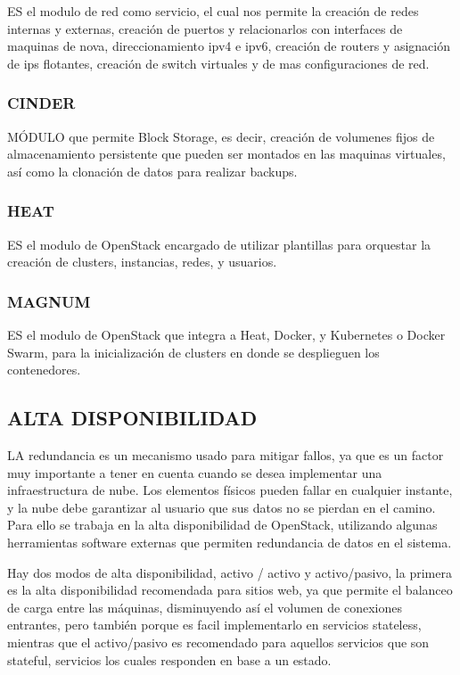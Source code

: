     ES el modulo de red como servicio, el cual nos permite la creación de redes internas y externas, creación de puertos y relacionarlos con interfaces de maquinas de nova, direccionamiento ipv4 e ipv6, creación de routers y asignación de ips flotantes, creación de switch virtuales y de mas configuraciones de red.
    
    \subsubsection{CINDER}
    
    MÓDULO que permite Block Storage, es decir, creación de volumenes fijos de almacenamiento persistente que pueden ser montados en las maquinas virtuales, así como la clonación de datos para realizar backups.
    
    \subsubsection{HEAT}
    
    ES el modulo de OpenStack encargado de utilizar plantillas para orquestar la creación de clusters, instancias, redes, y usuarios.
    
    \subsubsection{MAGNUM}
    
    ES el modulo de OpenStack que integra a Heat, Docker, y Kubernetes o Docker Swarm, para la inicialización de clusters en donde se desplieguen los contenedores.
    
    \subsection{ALTA DISPONIBILIDAD} 
    
    LA redundancia es un mecanismo usado para mitigar fallos, ya que es un factor muy importante a tener en cuenta cuando se desea implementar una infraestructura de nube. Los elementos físicos pueden fallar en cualquier instante, y la nube debe garantizar al usuario que sus datos no se pierdan en el camino. Para ello se trabaja en la alta disponibilidad de OpenStack, utilizando algunas herramientas software externas que permiten redundancia de datos en el sistema.
    
    Hay dos modos de alta disponibilidad, activo / activo y activo/pasivo, la primera es la alta disponibilidad recomendada para sitios web, ya que permite el balanceo de carga entre las máquinas, disminuyendo así el volumen de conexiones entrantes, pero también porque es facil implementarlo en servicios stateless, mientras que el activo/pasivo es recomendado para aquellos servicios que son stateful, servicios los cuales responden en base a un estado.
 
